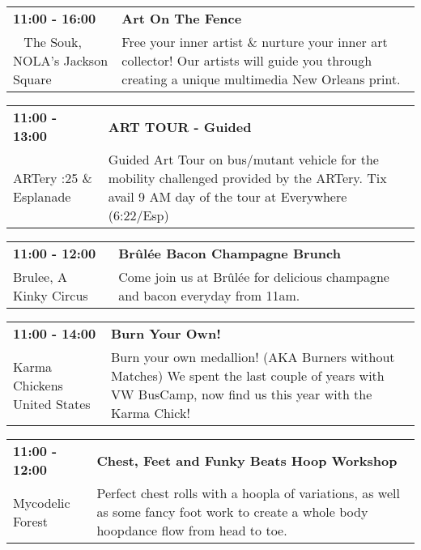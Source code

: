 \begin{tabular}{ p{1in} p{2.2in} }
    \textbf{11:00 - 16:00} & \textbf{Art On The Fence} \\
    ~ \newline The Souk, NOLA's Jackson Square  & Free your inner artist \& nurture your inner art collector! Our artists will guide you through creating a unique multimedia New Orleans print. \\
    \hline 
\end{tabular}
    
\begin{tabular}{ p{1in} p{2.2in} }
    \textbf{11:00 - 13:00} & \textbf{ART TOUR - Guided} \\
    ARTery \newline 6:25 \& Esplanade & Guided Art Tour on bus/mutant vehicle for the mobility challenged provided by the ARTery.  Tix avail 9 AM  day of the tour at Everywhere (6:22/Esp) \\
    \hline 
\end{tabular}
    
\begin{tabular}{ p{1in} p{2.2in} }
    \textbf{11:00 - 12:00} & \textbf{Br\^ul\'ee Bacon Champagne Brunch} \\
    Brulee, A Kinky Circus \newline  & Come join us at Br\^ul\'ee for delicious champagne and bacon everyday from 11am. \\
    \hline 
\end{tabular}
    
\begin{tabular}{ p{1in} p{2.2in} }
    \textbf{11:00 - 14:00} & \textbf{Burn Your Own!} \\
    Karma Chickens \newline United States & Burn your own medallion! (AKA Burners without Matches) We spent the last couple of years with VW BusCamp, now find us this year with the Karma Chick! \\
    \hline 
\end{tabular}
    
\begin{tabular}{ p{1in} p{2.2in} }
    \textbf{11:00 - 12:00} & \textbf{Chest, Feet and Funky Beats Hoop Workshop} \\
    Mycodelic Forest \newline  & Perfect chest rolls with a hoopla of variations, as well as some fancy foot work to create a whole body hoopdance flow from head to toe. \\
    \hline 
\end{tabular}
    
